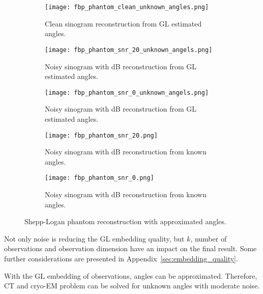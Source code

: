 \begin{figure}[H]
    \captionsetup[subfigure]{justification=centering}
    \centering
    \begin{subfigure}[t]{0.3\textwidth}
        \texttt{[image: fbp\_phantom\_clean\_unknown\_angles.png]}
        \caption{Clean sinogram reconstruction from GL estimated angles.}
        \label{fig:clean_reco_unknown}
    \end{subfigure}\hfill
    \begin{subfigure}[t]{0.3\textwidth}
      \texttt{[image: fbp\_phantom\_snr\_20\_unknown\_angels.png]}
      \caption{Noisy sinogram with  dB reconstruction from GL estimated angles.}
      \label{fig:noisy_snr20_reco_unknown}
    \end{subfigure}\hfill
    \begin{subfigure}[t]{0.3\textwidth}
      \texttt{[image: fbp\_phantom\_snr\_0\_unknown\_angels.png]}
      \caption{Noisy sinogram with  dB reconstruction from GL estimated angles.}
      \label{fig:noisy_snr0_reco_unknown}
    \end{subfigure}

    \begin{subfigure}[t]{0.3\textwidth}
      \texttt{[image: fbp\_phantom\_snr\_20.png]}
      \caption{Noisy sinogram with  dB reconstruction from known angles.}
      \label{fig:noisy_snr20_reco_known}
    \end{subfigure}\hfill
    \begin{subfigure}[t]{0.3\textwidth}
      \texttt{[image: fbp\_phantom\_snr\_0.png]}
      \caption{Noisy sinogram with  dB reconstruction from known angles.}
      \label{fig:noisy_snr0_reco_known}
    \end{subfigure}

    \caption{Shepp-Logan phantom reconstruction with approximated angles.}
    \label{fig:phantom_fbp_unknown_angles}
  \end{figure}

  Not only noise is reducing the GL embedding quality, but $k$, number of observations 
  and observation dimension have an impact on the final result.
  Some further considerations are presented in Appendix~\ref{sec:embedding_quality}.

  \begin{tcolorbox}[colback=red!5!white,colframe=red!75!black]
    With the GL embedding of observations, angles can be approximated.
    Therefore, CT and cryo-EM problem can be solved for unknown angles with moderate noise.
  \end{tcolorbox}

